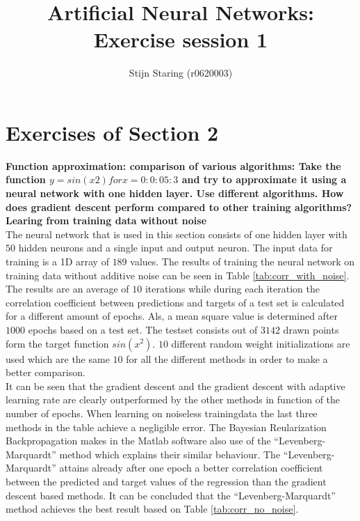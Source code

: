 \documentclass[a4paper,10pt]{article}
\title{Artificial Neural Networks: Exercise session 1}
\author{Stijn Staring (r0620003)}
\newcommand{\RemoveMe}[1]{{\color{purple}#1}}
\begin{document}
\selectfont{}

\maketitle


\section{Exercises of Section 2}
\textbf{Function approximation: comparison of various algorithms:
	Take the function $y = sin(x2) for x = 0 : 0:05 : 3$ and try to approximate it using a neural network with one hidden
	layer. Use different algorithms. How does gradient descent perform compared to other training algorithms?}\\

\textbf{Learing from training data without noise}\\
The neural network that is used in this section consists of one hidden layer with $ 50 $ hidden neurons and a single input and output neuron. The input data for training is a 1D array of $ 189  $ values. 
The results of training the neural network on training data without additive noise can be seen in Table \ref{tab:corr_with_noise}. The results are an average of $ 10 $ iterations while during each iteration the correlation coefficient between predictions and targets of a test set is calculated for a different amount of epochs. Als, a mean square value is determined after $ 1000 $ epochs based on a test set. The testset consists out of $ 3142 $ drawn points form the target function $ sin(x^2) $. $ 10 $ different random weight initializations are used which are the same $ 10 $ for all the different methods in order to make a better comparison.\\

It can be seen that the gradient descent and the gradient descent with adaptive learning rate are clearly outperformed by the other methods in function of the number of epochs. When learning on noiseless trainingdata the last three methods in the table achieve a negligible error. The Bayesian Reularization Backpropagation makes in the Matlab software also use of the ``Levenberg-Marquardt'' method which explains their similar behaviour. The ``Levenberg-Marquardt'' attains already after one epoch a better correlation coefficient between the predicted and target values of the regression than the gradient descent based methods. It can be concluded that the ``Levenberg-Marquardt'' method achieves the best result based on Table \ref{tab:corr_no_noise}.\\
\end{document}

